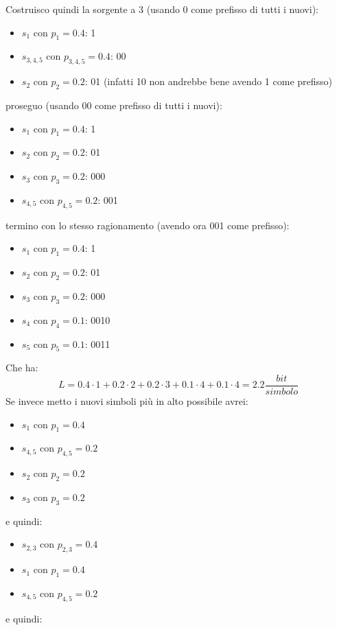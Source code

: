 \documentclass[a4paper,12pt, oneside]{book}
\begin{document}
\begin{esempio}
  Costruisco quindi la sorgente a 3 (usando 0 come prefisso di tutti i nuovi):
  \begin{itemize}
    \item $s_1$ con $p_1=0.4$: 1
    \item $s_{3,4,5}$ con $p_{3,4,5}=0.4$: 00
    \item $s_2$ con $p_2=0.2$: 01 (infatti 10 non andrebbe bene avendo 1 come prefisso)
  \end{itemize}
  proseguo (usando 00 come prefisso di tutti i nuovi):
    \begin{itemize}
    \item $s_1$ con $p_1=0.4$: 1
    \item $s_2$ con $p_2=0.2$: 01
    \item $s_3$ con $p_3=0.2$: 000
    \item $s_{4,5}$ con $p_{4,5}=0.2$: 001
  \end{itemize}
  termino con lo stesso ragionamento (avendo ora 001 come prefisso):
  \begin{itemize}
    \item $s_1$ con $p_1=0.4$: 1
    \item $s_2$ con $p_2=0.2$: 01
    \item $s_3$ con $p_3=0.2$: 000
    \item $s_4$ con $p_4=0.1$: 0010
    \item $s_5$ con $p_5=0.1$: 0011
  \end{itemize}
  Che ha:
  \[L=0.4\cdot 1+0.2\cdot 2+0.2\cdot 3+0.1\cdot 4+0.1\cdot 4 =
    2.2\frac{bit}{simbolo}\]
  Se invece metto i nuovi simboli più in alto possibile avrei:
  \begin{itemize}
    \item $s_1$ con $p_1=0.4$
    \item $s_{4,5}$ con $p_{4,5}=0.2$
    \item $s_2$ con $p_2=0.2$
    \item $s_3$ con $p_3=0.2$
  \end{itemize}
  e quindi:

  \begin{itemize}
    \item $s_{2,3}$ con $p_{2,3}=0.4$
    \item $s_1$ con $p_1=0.4$
    \item $s_{4,5}$ con $p_{4,5}=0.2$
  \end{itemize}
  e quindi:


\end{esempio}
\end{document}
